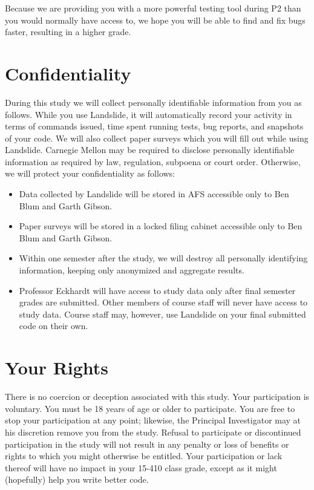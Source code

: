 \documentclass{article}
\begin{document}
Because we are providing you with a more powerful testing tool during P2 than you would normally have access to, we hope you will be able to find and fix bugs faster, resulting in a higher grade.

\section{Confidentiality}

During this study we will collect personally identifiable information from you as follows. While you use Landslide, it will automatically record your activity in terms of commands issued, time spent running tests, bug reports, and snapshots of your code. We will also collect paper surveys which you will fill out while using Landslide.
Carnegie Mellon may be required to disclose personally identifiable information as required by law, regulation, subpoena or court order.
Otherwise, we will protect your confidentiality as follows:

\begin{itemize}
	\item Data collected by Landslide will be stored in AFS accessible only to Ben Blum and Garth Gibson.
	\item Paper surveys will be stored in a locked filing cabinet accessible only to Ben Blum and Garth Gibson.
	\item Within one semester after the study, we will destroy all personally identifying information, keeping only anonymized and aggregate results.
	\item Professor Eckhardt will have access to study data only after final semester grades are submitted. Other members of course staff will never have access to study data. Course staff may, however, use Landslide on your final submitted code on their own.
\end{itemize}

\section{Your Rights}
There is no coercion or deception associated with this study.
Your participation is voluntary.
You must be 18 years of age or older to participate.
You are free to stop your participation at any point; likewise, the Principal Investigator may at his discretion remove you from the study.
Refusal to participate or discontinued participation in the study will not result in any penalty or loss of benefits or rights to which you might otherwise be entitled.
Your participation or lack thereof will have no impact in your 15-410 class grade, except as it might (hopefully) help you write better code.
\\
\end{document}
